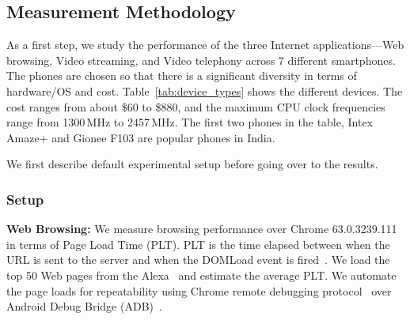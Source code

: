 
\subsection{Measurement Methodology} 
\label{sec:motivation}

As a first step, we study the performance of the three Internet applications---Web browsing, Video streaming, and Video telephony across 7  different smartphones. 
The phones are chosen so that there is a significant
diversity in terms of hardware/OS and cost. Table~\ref{tab:device_types} shows the different devices. The cost ranges from  about \$60 to \$880, and the maximum CPU clock frequencies range from 1300\,MHz to 2457\,MHz. The first two phones in the table, Intex Amaze+ and Gionee F103 are popular phones in India.

We first describe default experimental setup 
before going over to the results.

\subsubsection{Setup}
\label{sec:setup}


\noindent\textbf{Web Browsing:} We measure browsing performance over Chrome 63.0.3239.111 in terms of Page Load Time (PLT). 
PLT is the time elapsed between when the URL is sent to the server and when the DOMLoad event is fired~\cite{wang2013demystifying}. We load the top 50 Web pages from the Alexa~\cite{alexa} and estimate the average PLT. We automate the page loads for repeatability using Chrome remote debugging protocol~\cite{ggle} over Android Debug Bridge (ADB)~\cite{adb}.

